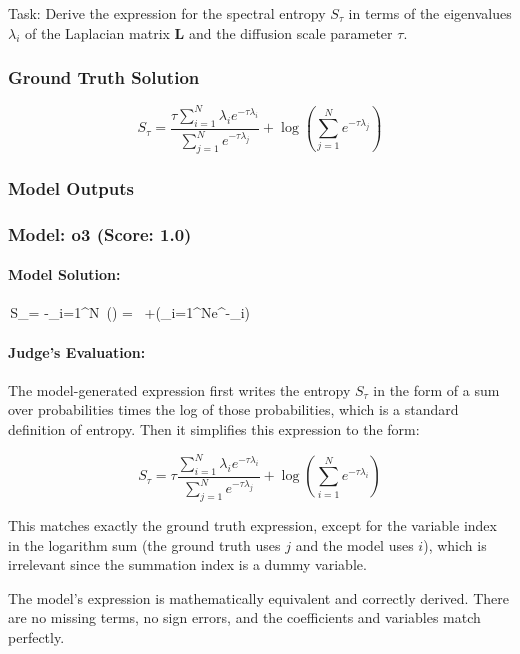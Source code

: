 \documentclass[10pt]{article}
\begin{document}
Task:
Derive the expression for the spectral entropy $S_{\tau}$ in terms of the eigenvalues $\lambda_i$ of the Laplacian matrix $\mathbf{L}$ and the diffusion scale parameter $\tau$.

\subsubsection*{Ground Truth Solution}
\[ \boxed{S_{\tau} = \frac{\tau \sum_{i=1}^N \lambda_i e^{-\tau \lambda_i}}{\sum_{j=1}^N e^{-\tau \lambda_j}} + \log \left( \sum_{j=1}^N e^{-\tau \lambda_j} \right)} \]

\subsubsection*{Model Outputs}
\subsubsection*{Model: o3 (Score: 1.0)}
\paragraph*{Model Solution:}
\,S_{\tau}= -\sum_{i=1}^{N}\,
\ln\!\left(\right)
=\;
\tau\,
+\ln\!\left(\sum_{i=1}^{N}e^{-\tau\lambda_i}\right)

\paragraph*{Judge's Evaluation:}

The model-generated expression first writes the entropy \( S_\tau \) in the form of a sum over probabilities times the log of those probabilities, which is a standard definition of entropy. Then it simplifies this expression to the form:

\[
S_{\tau} = \tau \frac{\sum_{i=1}^N \lambda_i e^{-\tau \lambda_i}}{\sum_{j=1}^N e^{-\tau \lambda_j}} + \log \left( \sum_{i=1}^N e^{-\tau \lambda_i} \right)
\]

This matches exactly the ground truth expression, except for the variable index in the logarithm sum (the ground truth uses \( j \) and the model uses \( i \)), which is irrelevant since the summation index is a dummy variable.

The model's expression is mathematically equivalent and correctly derived. There are no missing terms, no sign errors, and the coefficients and variables match perfectly.
\end{document}
